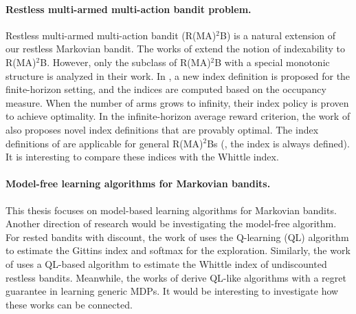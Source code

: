 \paragraph{Restless multi-armed multi-action bandit problem.}
Restless multi-armed multi-action bandit (R(MA)$^2$B) is a natural extension of our restless Markovian bandit.
The works of \cite{glazebrook2011general,hodge2015asymptotic} extend the notion of indexability to R(MA)$^2$B.
However, only the subclass of R(MA)$^2$B with a special monotonic structure is analyzed in their work.
In \cite{xiong2021reinforcement}, a new index definition is proposed for the finite-horizon setting, and the indices are computed based on the occupancy measure.
When the number of arms grows to infinity, their index policy is proven to achieve optimality.
In the infinite-horizon average reward criterion, the work of \cite{xiong2022learning} also proposes novel index definitions that are provably optimal.
The index definitions of \cite{xiong2021reinforcement, xiong2022learning} are applicable for general R(MA)$^2$Bs (\ie, the index is always defined).
It is interesting to compare these indices with the Whittle index.



\paragraph{Model-free learning algorithms for Markovian bandits.}
This thesis focuses on model-based learning algorithms for Markovian bandits. 
Another direction of research would be investigating the model-free algorithm.
For rested bandits with discount, the work of \cite{duff1995q} uses the Q-learning (QL) algorithm to estimate the Gittins index and softmax for the exploration.
Similarly, the work of \cite{avrachenkov2022whittle} uses a QL-based algorithm to estimate the Whittle index of undiscounted restless bandits.
Meanwhile, the works of \cite{jin2018q, wei2020model} derive QL-like algorithms with a regret guarantee in learning generic MDPs.
It would be interesting to investigate how these works can be connected.

